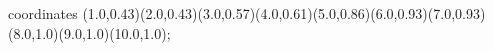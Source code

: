 					coordinates { (1.0,0.43)(2.0,0.43)(3.0,0.57)(4.0,0.61)(5.0,0.86)(6.0,0.93)(7.0,0.93)(8.0,1.0)(9.0,1.0)(10.0,1.0)};
